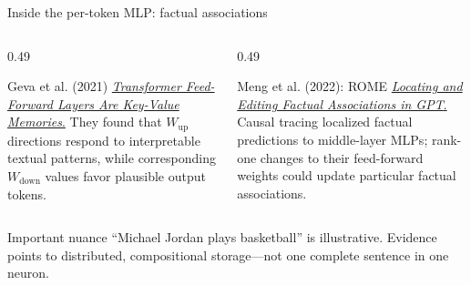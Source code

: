 \begin{frame}{Inside the per-token MLP: factual associations}
  \vspace{-0.4em}
  \begin{columns}[T,onlytextwidth]
    \begin{column}{0.49\textwidth}
      \begin{block}{Geva et al. (2021)}
        \scriptsize
        \href{https://arxiv.org/abs/2012.14913}{\emph{Transformer Feed-Forward
        Layers Are Key-Value Memories}.}
        They found that \(W_{\mathrm{up}}\) directions respond to interpretable
        textual patterns, while corresponding \(W_{\mathrm{down}}\) values favor
        plausible output tokens.
      \end{block}
    \end{column}
    \begin{column}{0.49\textwidth}
      \begin{block}{Meng et al. (2022): ROME}
        \scriptsize
        \href{https://arxiv.org/abs/2202.05262}{\emph{Locating and Editing
        Factual Associations in GPT}.}
        Causal tracing localized factual predictions to middle-layer MLPs;
        rank-one changes to their feed-forward weights could update particular
        factual associations.
      \end{block}
    \end{column}
  \end{columns}

  \vspace{-0.4em}
  \begin{alertblock}{Important nuance}
    \footnotesize
    ``Michael Jordan plays basketball'' is illustrative. Evidence points to
    distributed, compositional storage---not one complete sentence in one neuron.
  \end{alertblock}
\end{frame}

